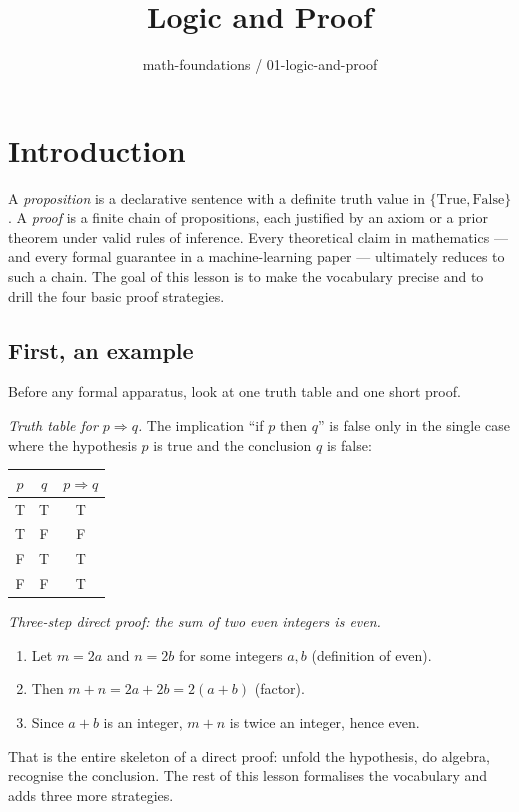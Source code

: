 \documentclass[11pt]{article}
\title{Logic and Proof}
\author{math-foundations / 01-logic-and-proof}
\date{}
\begin{document}
\maketitle

\section*{Introduction}

A \emph{proposition} is a declarative sentence with a definite truth value in
$\{\text{True}, \text{False}\}$. A \emph{proof} is a finite chain of
propositions, each justified by an axiom or a prior theorem under valid rules
of inference. Every theoretical claim in mathematics --- and every formal
guarantee in a machine-learning paper --- ultimately reduces to such a chain.
The goal of this lesson is to make the vocabulary precise and to drill the four
basic proof strategies.

\subsection*{First, an example}

Before any formal apparatus, look at one truth table and one short proof.

\emph{Truth table for $p \Rightarrow q$.} The implication ``if $p$ then $q$''
is false only in the single case where the hypothesis $p$ is true and the
conclusion $q$ is false:
\begin{center}
\begin{tabular}{cc|c}
$p$ & $q$ & $p \Rightarrow q$ \\ \hline
T & T & T \\
T & F & F \\
F & T & T \\
F & F & T \\
\end{tabular}
\end{center}

\emph{Three-step direct proof: the sum of two even integers is even.}
\begin{enumerate}
  \item Let $m = 2a$ and $n = 2b$ for some integers $a, b$ (definition of even).
  \item Then $m + n = 2a + 2b = 2(a+b)$ (factor).
  \item Since $a+b$ is an integer, $m+n$ is twice an integer, hence even.
\end{enumerate}
That is the entire skeleton of a direct proof: unfold the hypothesis, do
algebra, recognise the conclusion. The rest of this lesson formalises the
vocabulary and adds three more strategies.
\end{document}
